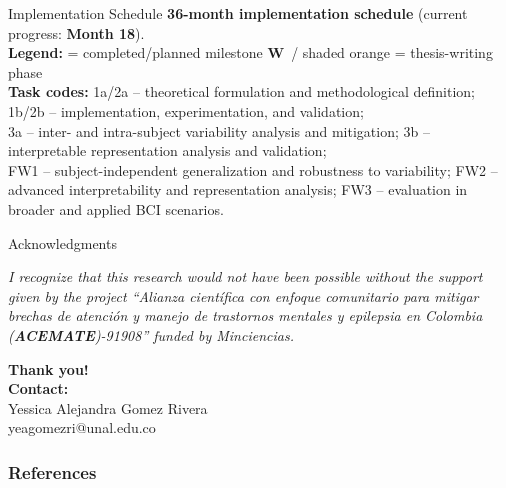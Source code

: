 \documentclass[aspectratio=169]{beamer}
\newcommand{\cmark}{\checkmark}
\newcommand{\wmark}{\textbf{W}}
\begin{document}
\begin{frame}{Implementation Schedule}
\vspace{0.6em}
\tiny
\textbf{36-month implementation schedule} (current progress: \textbf{Month 18}).\\[0.3ex]
\textbf{Legend:} \cmark = completed/planned milestone \hspace{1em}
\wmark\ / shaded orange = thesis-writing phase\\[0.4ex]
\textbf{Task codes:}
1a/2a – theoretical formulation and methodological definition; 1b/2b – implementation, experimentation, and validation;\\
3a – inter- and intra-subject variability analysis and mitigation; 3b – interpretable representation analysis and validation;\\
FW1 – subject-independent generalization and robustness to variability; FW2 – advanced interpretability and representation analysis; FW3 – evaluation in broader and applied BCI scenarios.
\end{frame}

\begin{frame}{Acknowledgments}


   \textit{I recognize that this research would not have been possible without the support given by the project
    “Alianza científica con enfoque comunitario para mitigar brechas de atención y manejo de trastornos
    mentales y epilepsia en Colombia (\textbf{ACEMATE})-91908” funded by Minciencias.}


\begin{center}
	{\Huge{\textbf{\textcolor{frameblue}{Thank you!}}}}\\
	\vspace{0.2cm}
    \textbf{Contact:}\\
    \vspace{0.2cm}
	 Yessica Alejandra Gomez Rivera\\ {\scriptsize{yeagomezri@unal.edu.co}}\\

\end{center}    
    
\end{frame}

\begin{frame}[allowframebreaks]%
\frametitle{References}
{\tiny 


}
\end{frame}
\end{document}
